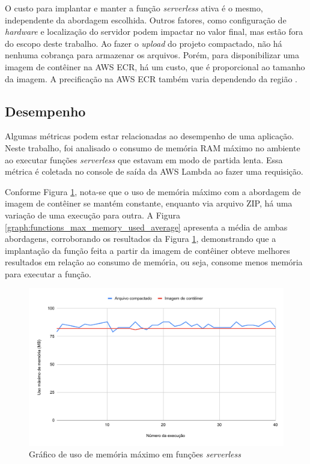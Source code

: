 \documentclass[conference]{IEEEtran}
\begin{document}
O custo para implantar e manter a função \textit{serverless} ativa é o mesmo, independente da abordagem escolhida. Outros fatores, como configuração de \textit{hardware} e localização do servidor podem impactar no valor final, mas estão fora do escopo deste trabalho.
Ao fazer o \textit{upload} do projeto compactado, não há nenhuma cobrança para armazenar os arquivos. Porém, para disponibilizar uma imagem de contêiner na AWS ECR, há um custo, que é proporcional ao tamanho da imagem. A precificação na AWS ECR também varia dependendo da região \cite{aws_2023_ecr_pricing}. 

\subsection{Desempenho}
\label{subsec:performance}

Algumas métricas podem estar relacionadas ao desempenho de uma aplicação. Neste trabalho, foi analisado o consumo de memória RAM máximo no ambiente ao executar funções \textit{serverless} que estavam em modo de partida lenta. Essa métrica é coletada no console de saída da AWS Lambda ao fazer uma requisição.

Conforme Figura \ref{graph:functions_max_memory_used}, nota-se que o uso de memória máximo com a abordagem de imagem de contêiner se mantém constante, enquanto via arquivo ZIP, há uma variação de uma execução para outra. A Figura \ref{graph:functions_max_memory_used_average} apresenta a média de ambas abordagens, corroborando os resultados da Figura \ref{graph:functions_max_memory_used}, demonstrando que a implantação da função feita a partir da imagem de contêiner obteve melhores resultados em relação ao consumo de memória, ou seja, consome menos memória para executar a função. 

\begin{figure}[H]
    \centering 
    \includegraphics [width=\linewidth]{images/max-memory-use-PT.pdf}
    \par
    \caption{Gráfico de uso de memória máximo em funções \textit{serverless}}
    \label{graph:functions_max_memory_used}
\end{figure}
\end{document}
